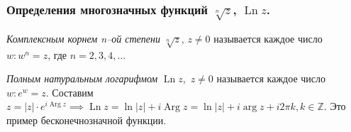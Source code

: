 \subsubsection{Определения многозначных функций $\sqrt[n]{z}$, $\operatorname{Ln} z$.}

\begin{definition*}
	\textit{Комплексным корнем n--ой степени } $\sqrt[n] z, \,z \neq 0$  называется каждое число $w: w^n = z$, где $ n = 2, 3, 4, \dots$
\end{definition*}


\begin{definition*}
	\textit{Полным натуральным логарифмом } $\operatorname{Ln} z$, $ \,z \neq 0$  называется каждое число $w: e^w = z$.
	Составим $z = |z| \cdot e^{i\operatorname{Arg} z} \implies \operatorname{Ln} z  = \ln |z| + i \operatorname{Arg} z = \ln |z| + i \operatorname{arg} z + i 2\pi k, k \in \mathbb{Z}$. Это пример бесконечнозначной функции.
\end{definition*}